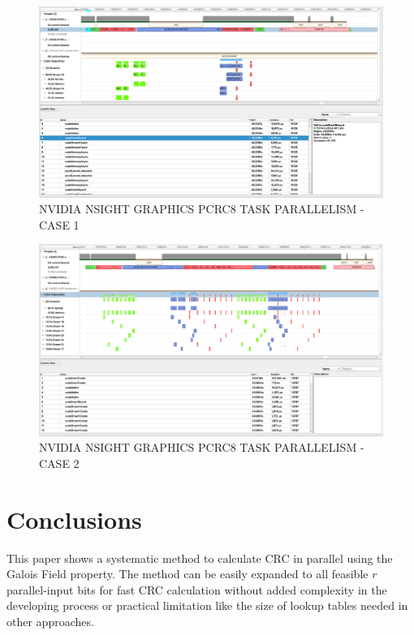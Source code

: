 \documentclass[fleqn]{IEEEtran}
\begin{document}
\begin{figure}[bt]
\centering
\includegraphics[width=\textwidth]{figures/NSG-PCRC8-task-parallelism-1.png}
\caption{NVIDIA NSIGHT GRAPHICS PCRC8 TASK PARALLELISM - CASE 1}
\label{fig:NSG-PCRC8-task-parallelism-1}
\end{figure}

\begin{figure}[bt]
\centering
\includegraphics[width=\textwidth]{figures/NSG-PCRC8-task-parallelism-2.png}
\caption{NVIDIA NSIGHT GRAPHICS PCRC8 TASK PARALLELISM - CASE 2}
\label{fig:NSG-PCRC8-task-parallelism-2}
\end{figure}

\section{Conclusions}
This paper shows a systematic method to calculate CRC in parallel using the 
Galois Field property. The method can be easily expanded to all feasible $r$ 
parallel-input bits for fast CRC calculation without added complexity in the 
developing process or practical limitation like the size of lookup tables 
needed in other approaches.
\end{document}
